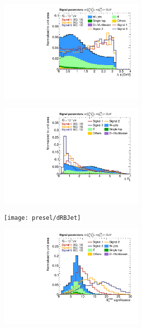 \begin{figure}
\begin{subfigure}[b]{0.5\linewidth}
	\end{subfigure}\hfill
	\begin{subfigure}[b]{0.5\linewidth}
		\centering\includegraphics[width=0.8\textwidth]{presel/dphimetlep}
	\end{subfigure}\hfill
	\par\medskip
	\begin{subfigure}[b]{0.5\linewidth}
		\centering\includegraphics[width=0.8\textwidth]{presel/dRJet}
	\end{subfigure}\hfill
	\begin{subfigure}[b]{0.5\linewidth}
		\centering\texttt{[image: presel/dRBJet]}
	\end{subfigure}\hfill
	\par\medskip
	\begin{subfigure}[b]{0.5\linewidth}
		\centering\includegraphics[width=0.8\textwidth]{presel/metsig}

\end{subfigure}
\end{figure}
